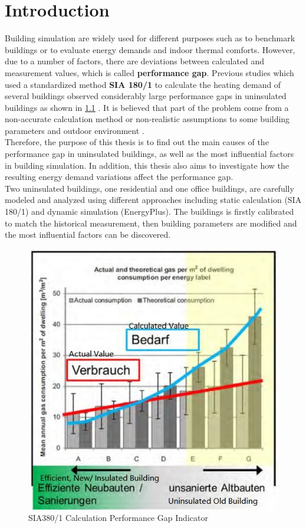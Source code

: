 \chapter{Introduction}\label{sec:introduction}
	
		Building simulation are widely used for different purposes such as to benchmark buildings or to evaluate energy demands and indoor thermal comforts. However, due to a number of factors, there are deviations between calculated  and measurement values, which is called \textbf{performance gap}. Previous studies which used a standardized method \textbf{SIA 180/1} to calculate the heating demand of several buildings observed considerably large performance gaps in uninsulated buildings as shown in \ref{fig:SIA380PG} \cite{SIAPreviousreport}. It is believed that part of the problem come from a non-accurate calculation method or non-realistic assumptions to some building parameters and outdoor environment \cite{SIAPreviousreport}. \\
	
	
		Therefore, the purpose of this thesis is to find out the main causes of the performance gap in uninsulated buildings, as well as the most influential factors in building simulation. In addition, this thesis also aims to investigate how the resulting energy demand variations affect the performance gap.\\

	
		Two uninsulated buildings, one residential and one office buildings, are carefully modeled and analyzed using different approaches including static calculation (SIA 180/1) and dynamic simulation (EnergyPlus). The buildings is firstly calibrated to match the historical measurement, then building parameters are modified and the most influential factors can be discovered.\\

			\begin{figure}[h!]
			\centering
			\includegraphics[scale=0.65]{Figure/SIA380Issue.jpg}
			\caption{SIA380/1 Calculation Performance Gap Indicator \cite{SIAPreviousreport}}
			\label{fig:SIA380PG}
			\end{figure}

